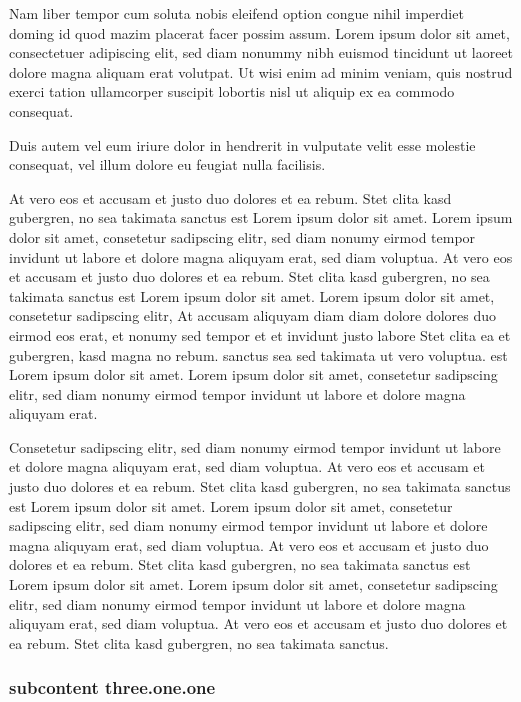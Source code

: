 Nam liber tempor cum soluta nobis eleifend option congue nihil imperdiet doming
id quod mazim placerat facer possim assum. Lorem ipsum dolor sit amet,
consectetuer adipiscing elit, sed diam nonummy nibh euismod tincidunt ut laoreet
dolore magna aliquam erat volutpat. Ut wisi enim ad minim veniam, quis nostrud
exerci tation ullamcorper suscipit lobortis nisl ut aliquip ex ea commodo
consequat.

Duis autem vel eum iriure dolor in hendrerit in vulputate velit esse molestie
consequat, vel illum dolore eu feugiat nulla facilisis.

At vero eos et accusam et justo duo dolores et ea rebum. Stet clita kasd
gubergren, no sea takimata sanctus est Lorem ipsum dolor sit amet. Lorem ipsum
dolor sit amet, consetetur sadipscing elitr, sed diam nonumy eirmod tempor
invidunt ut labore et dolore magna aliquyam erat, sed diam voluptua. At vero eos
et accusam et justo duo dolores et ea rebum. Stet clita kasd gubergren, no sea
takimata sanctus est Lorem ipsum dolor sit amet. Lorem ipsum dolor sit amet,
consetetur sadipscing elitr, At accusam aliquyam diam diam dolore dolores duo
eirmod eos erat, et nonumy sed tempor et et invidunt justo labore Stet clita ea
et gubergren, kasd magna no rebum. sanctus sea sed takimata ut vero voluptua.
est Lorem ipsum dolor sit amet. Lorem ipsum dolor sit amet, consetetur
sadipscing elitr, sed diam nonumy eirmod tempor invidunt ut labore et dolore
magna aliquyam erat.

Consetetur sadipscing elitr, sed diam nonumy eirmod tempor invidunt ut labore et
dolore magna aliquyam erat, sed diam voluptua. At vero eos et accusam et justo
duo dolores et ea rebum. Stet clita kasd gubergren, no sea takimata sanctus est
Lorem ipsum dolor sit amet. Lorem ipsum dolor sit amet, consetetur sadipscing
elitr, sed diam nonumy eirmod tempor invidunt ut labore et dolore magna aliquyam
erat, sed diam voluptua. At vero eos et accusam et justo duo dolores et ea
rebum. Stet clita kasd gubergren, no sea takimata sanctus est Lorem ipsum dolor
sit amet. Lorem ipsum dolor sit amet, consetetur sadipscing elitr, sed diam
nonumy eirmod tempor invidunt ut labore et dolore magna aliquyam erat, sed diam
voluptua. At vero eos et accusam et justo duo dolores et ea rebum. Stet clita
kasd gubergren, no sea takimata sanctus.

 \subsubsection{subcontent three.one.one}   

